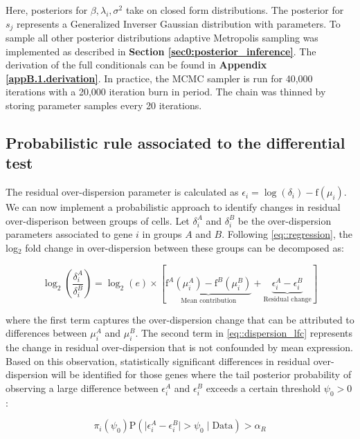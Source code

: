 Here, posteriors for $\beta, \lambda_i, \sigma^2$ take on closed form distributions. The posterior for $s_j$ represents a Generalized Inverser Gaussian distribution with parameters. To sample all other posterior distributions adaptive Metropolis sampling was implemented as described in \textbf{Section \ref{sec0:posterior_inference}}. The derivation of the full conditionals can be found in \textbf{Appendix  \ref{appB.1.derivation}}. In practice, the MCMC sampler is run for 40,000 iterations with a 20,000 iteration burn in period. The chain was thinned by storing parameter samples every 20 iterations.

\newpage

\subsection{Probabilistic rule associated to the differential test} \label{sec:differentialtest}

The residual over-dispersion parameter is calculated as $\epsilon_i=\log(\delta_i)-\text{f}(\mu_i)$. We can now implement a probabilistic approach to identify changes in residual over-disperison between groups of cells. Let $\delta_i^A$ and $\delta_i^B$ be the over-dispersion parameters associated to gene $i$ in groups $A$ and $B$. Following \ref{eq::regression}, the log$_2$ fold change in over-dispersion between these groups can be decomposed as: 

\begin{equation} \label{eq::dispersion_lfc}
\log_2 \left( \frac{\delta_i^A}{\delta_i^B}\right) = \log_2(e) \times \left[\underbrace{\text{f}^A(\mu_i^A) - \text{f}^B(\mu_i^B) }_{\text{Mean contribution}} + \underbrace{\epsilon_i^A - \epsilon_i^B}_{\text{Residual change}} \right]
\end{equation} 

where the first term captures the over-dispersion change that can be attributed to differences between $\mu_i^A$ and $\mu_i^B$. The second term in \ref{eq::dispersion_lfc} represents the change in residual over-dispersion that is not confounded by mean expression. Based on this observation, statistically significant differences in residual over-dispersion will be identified for those genes where the tail posterior probability of observing a large difference between $\epsilon_i^A$ and $\epsilon_i^B$ exceeds a certain threshold $\psi_0 > 0$:

\begin{equation} \label{eq::decision_rule}
\pi_i(\psi_0)\text{P}(\mid\epsilon_i^{A}-\epsilon_i^{B}\mid >\psi_0 \mid \text{Data} ) >\alpha_R
\end{equation}
 

